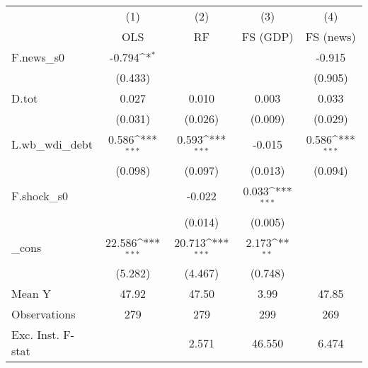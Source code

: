 {
\def\sym#1{\ifmmode^{#1}\else\(^{#1}\)\fi}
\begin{tabular}{l*{4}{c}}
\toprule
            &\multicolumn{1}{c}{(1)}&\multicolumn{1}{c}{(2)}&\multicolumn{1}{c}{(3)}&\multicolumn{1}{c}{(4)}\\
            &\multicolumn{1}{c}{OLS}&\multicolumn{1}{c}{RF}&\multicolumn{1}{c}{FS (GDP)}&\multicolumn{1}{c}{FS (news)}\\
\midrule
F.news\_s0   &      -0.794\sym{*}  &                     &                     &      -0.915         \\
            &     (0.433)         &                     &                     &     (0.905)         \\
\addlinespace
D.tot       &       0.027         &       0.010         &       0.003         &       0.033         \\
            &     (0.031)         &     (0.026)         &     (0.009)         &     (0.029)         \\
\addlinespace
L.wb\_wdi\_debt&       0.586\sym{***}&       0.593\sym{***}&      -0.015         &       0.586\sym{***}\\
            &     (0.098)         &     (0.097)         &     (0.013)         &     (0.094)         \\
\addlinespace
F.shock\_s0  &                     &      -0.022         &       0.033\sym{***}&                     \\
            &                     &     (0.014)         &     (0.005)         &                     \\
\addlinespace
\_cons      &      22.586\sym{***}&      20.713\sym{***}&       2.173\sym{**} &                     \\
            &     (5.282)         &     (4.467)         &     (0.748)         &                     \\
\midrule
Mean Y      &       47.92         &       47.50         &        3.99         &       47.85         \\
Observations&         279         &         279         &         299         &         269         \\
Exc. Inst. F-stat&                     &       2.571         &      46.550         &       6.474         \\
\bottomrule
\end{tabular}
}
